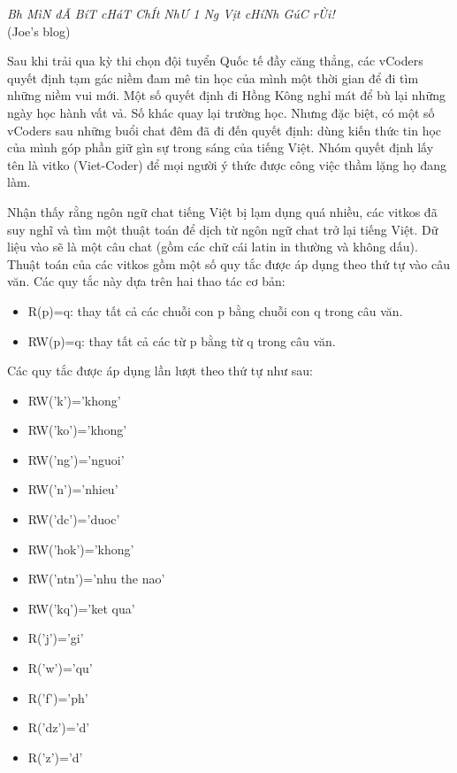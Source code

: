 

\textit{    Bh MìN đÃ BíT cHáT ChÍt NhƯ 1 Ng Vịt cHíNh GúC rÙi!   }
\\   (Joe's blog)    

   Sau khi trải qua kỳ thi chọn đội tuyển Quốc tế đầy căng thẳng, các vCoders quyết định tạm gác niềm đam mê tin học của mình một thời gian để đi tìm những niềm vui mới. Một số quyết định đi Hồng Kông nghỉ mát để bù lại những ngày học hành vất vả. Số khác quay lại trường học. Nhưng đặc biệt, có một số vCoders sau những buổi chat đêm đã đi đến quyết định: dùng kiến thức tin học của mình góp phần giữ gìn sự trong sáng của tiếng Việt. Nhóm quyết định lấy tên là vitko (Viet-Coder) để mọi người ý thức được công việc thầm lặng họ đang làm.  

   Nhận thấy rằng ngôn ngữ chat tiếng Việt bị lạm dụng quá nhiều, các vitkos đã suy nghĩ và tìm một thuật toán để dịch từ ngôn ngữ chat trở lại tiếng Việt. Dữ liệu vào sẽ là một câu chat (gồm các chữ cái latin in thường và không dấu). Thuật toán của các vitkos gồm một số quy tắc được áp dụng theo thứ tự vào câu văn. Các quy tắc này dựa trên hai thao tác cơ bản:  
\begin{itemize}
	\item     R(p)=q: thay tất cả các chuỗi con p bằng chuỗi con q trong câu văn.   
	\item     RW(p)=q: thay tất cả các từ p bằng từ q trong câu văn.   
\end{itemize}

   Các quy tắc được áp dụng lần lượt theo thứ tự như sau:  
\begin{itemize}
	\item     RW('k')='khong'   
	\item     RW('ko')='khong'   
	\item     RW('ng')='nguoi'   
	\item     RW('n')='nhieu'   
	\item     RW('dc')='duoc'   
	\item     RW('hok')='khong'   
	\item     RW('ntn')='nhu the nao'   
	\item     RW('kq')='ket qua'   
	\item     R('j')='gi'   
	\item     R('w')='qu'   
	\item     R('f')='ph'   
	\item     R('dz')='d'   
	\item     R('z')='d'   
\end{itemize}


